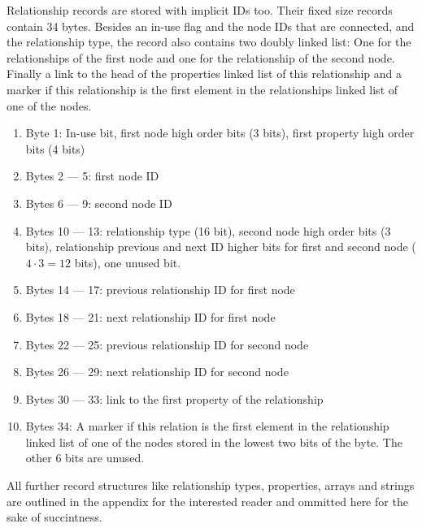             Relationship records are stored with implicit IDs too. 
            Their fixed size records contain 34 bytes.
            Besides an in-use flag and the node IDs that are connected, and the relationship type, the record also contains two doubly linked list: One for the relationships of the first node and one for the relationship of the second node.
            Finally a link to the head of the properties linked list of this relationship and a marker if this relationship is the first element in the relationships linked list of one of the nodes.
            \newpage
            
            \begin{enumerate}
                \item Byte 1: In-use bit, first node high order bits (3 bits), first property high order bits (4 bits)
                \item Bytes 2 --- 5: first node ID 
                \item Bytes 6 --- 9: second node ID 
                \item Bytes 10 --- 13: relationship type (16 bit), second node high order bits (3 bits), relationship previous and next ID higher bits for first and second node ($4 \cdot 3 = 12$ bits), one unused bit.
                \item Bytes 14 --- 17: previous relationship ID for first node
                \item Bytes 18 --- 21: next relationship ID for first node
                \item Bytes 22 --- 25: previous relationship ID for second node
                \item Bytes 26 --- 29: next relationship ID for second node
                \item Bytes 30 --- 33: link to the first property of the relationship
                \item Bytes 34: A marker if this relation is the first element in the relationship linked list of one of the nodes stored in the lowest two bits of the byte. 
                    The other 6 bits are unused.
            \end{enumerate}

        All further record structures like relationship types, properties, arrays and strings are outlined in the appendix for the interested reader and ommitted here for the sake of succintness.
    
            
            

    



